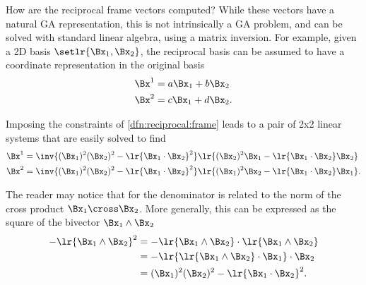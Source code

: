 %
%
How are the reciprocal frame vectors computed?  While these vectors have a natural GA representation, this is not intrinsically a GA problem, and can be solved with standard linear algebra, using a matrix inversion.
For example, given a 2D basis \( \setlr{ \Bx_1, \Bx_2 } \), the reciprocal basis can be assumed to have a coordinate representation in the original basis
\begin{equation}\label{eqn:reciprocal_R2:100}
\begin{aligned}
\Bx^1 &= a \Bx_1 + b \Bx_2 \\
\Bx^2 &= c \Bx_1 + d \Bx_2.
\end{aligned}
\end{equation}

Imposing the constraints of \cref{dfn:reciprocal:frame} leads to a pair of 2x2 linear systems that are easily solved to find
\begin{equation}\label{eqn:reciprocal_R2:120}
\begin{aligned}
\Bx^1 &= \inv{ (\Bx_1)^2 (\Bx_2)^2 - \lr{ \Bx_1 \cdot \Bx_2}^2 } \lr{ (\Bx_2)^2 \Bx_1 - \lr{ \Bx_1 \cdot \Bx_2 } \Bx_2 } \\
\Bx^2 &= \inv{ (\Bx_1)^2 (\Bx_2)^2 - \lr{ \Bx_1 \cdot \Bx_2}^2 } \lr{ (\Bx_1)^2 \Bx_2 - \lr{ \Bx_1 \cdot \Bx_2 } \Bx_1 }.
\end{aligned}
\end{equation}

The reader may notice that for  the denominator is related to the norm of the cross product \( \Bx_1 \cross \Bx_2 \).
More generally, this can be expressed as the square of the bivector \( \Bx_1 \wedge \Bx_2 \)
\begin{equation}\label{eqn:reciprocal_R2:140}
\begin{aligned}
-\lr{\Bx_1 \wedge \Bx_2 }^2
&= -\lr{\Bx_1 \wedge \Bx_2 } \cdot \lr{\Bx_1 \wedge \Bx_2 } \\
&= -\lr{ \lr{\Bx_1 \wedge \Bx_2 } \cdot \Bx_1 } \cdot \Bx_2 \\
&= (\Bx_1)^2 (\Bx_2)^2 - \lr{\Bx_1 \cdot \Bx_2}^2.
\end{aligned}
\end{equation}


